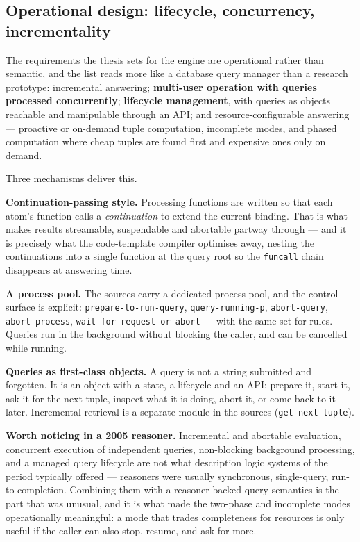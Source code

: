 \documentclass[11pt,a4paper,DIV=12,parskip=half]{scrartcl}
\newenvironment{note}
  {\begin{list}{}{\setlength{\leftmargin}{1.5em}\setlength{\rightmargin}{1.5em}%
                  \setlength{\listparindent}{0pt}}\item[]\small}
  {\end{list}}
\begin{document}
\subsection{Operational design: lifecycle, concurrency, incrementality}

The requirements the thesis sets for the engine are operational rather than
semantic, and the list reads more like a database query manager than a research
prototype: incremental answering; \textbf{multi-user operation with queries
processed concurrently}; \textbf{lifecycle management}, with queries as objects
reachable and manipulable through an API; and resource-configurable answering ---
proactive or on-demand tuple computation, incomplete modes, and phased
computation where cheap tuples are found first and expensive ones only on demand.

Three mechanisms deliver this.

\textbf{Continuation-passing style.} Processing functions are written so that
each atom's function calls a \emph{continuation} to extend the current binding.
That is what makes results streamable, suspendable and abortable partway
through --- and it is precisely what the code-template compiler optimises away,
nesting the continuations into a single function at the query root so the
\texttt{funcall} chain disappears at answering time.

\textbf{A process pool.} The sources carry a dedicated process pool, and the
control surface is explicit: \texttt{prepare-to-run-query},
\texttt{query-running-p}, \texttt{abort-query}, \texttt{abort-process},
\texttt{wait-for-request-or-abort} --- with the same set for rules. Queries run
in the background without blocking the caller, and can be cancelled while
running.

\textbf{Queries as first-class objects.} A query is not a string submitted and
forgotten. It is an object with a state, a lifecycle and an API: prepare it, start
it, ask it for the next tuple, inspect what it is doing, abort it, or come back
to it later. Incremental retrieval is a separate module in the sources
(\texttt{get-next-tuple}).

\begin{note}
\textbf{Worth noticing in a 2005 reasoner.} Incremental and abortable evaluation,
concurrent execution of independent queries, non-blocking background processing,
and a managed query lifecycle are not what description logic systems of the
period typically offered --- reasoners were usually synchronous, single-query,
run-to-completion. Combining them with a reasoner-backed query semantics is the
part that was unusual, and it is what made the two-phase and incomplete modes
operationally meaningful: a mode that trades completeness for resources is only
useful if the caller can also stop, resume, and ask for more.
\end{note}
\end{document}
